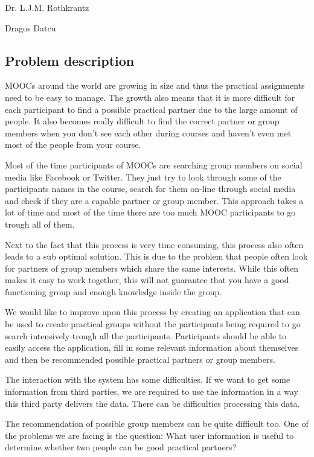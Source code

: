 Dr. L.J.M. Rothkrantz

Dragos Datcu

\subsection*{Problem description}
MOOCs around the world are growing in size and thus the practical assignments need to be easy to manage.
The growth also means that it is more difficult for each participant to find a possible practical partner due to the large amount of people.
It also becomes really difficult to find the correct partner or group members when you don't see each other during courses and haven't even met most of the people from your course.

Most of the time participants of MOOCs are searching group members on social media like Facebook or Twitter.
They just try to look through some of the participants names in the course, search for them on-line through social media and check if they are a capable partner or group member.
This approach takes a lot of time and most of the time there are too much MOOC participants to go trough all of them.

Next to the fact that this process is very time consuming, this process also often leads to a sub optimal solution.
This is due to the problem that people often look for partners of group members which share the same interests.
While this often makes it easy to work together, this will not guarantee that you have a good functioning group and enough knowledge inside the group.

We would like to improve upon this process by creating an application that can be used to create practical groups without the participants being required to go search intensively trough all the participants.
Participants should be able to easily access the application, fill in some relevant information about themselves and then be recommended possible practical partners or group members.

The interaction with the system has some difficulties.
If we want to get some information from third parties, we are required to use the information in a way this third party delivers the data.
There can be difficulties processing this data.
  
The recommendation of possible group members can be quite difficult too.
One of the problems we are facing is the question: What user information is useful to determine whether two people can be good practical partners?

